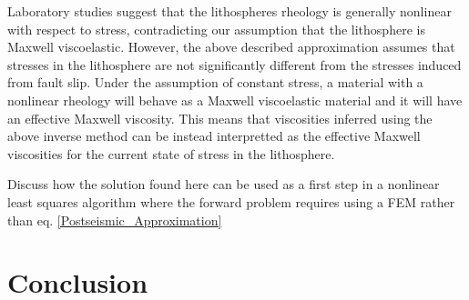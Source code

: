 \documentclass[12pt]{article}
\begin{document}
Laboratory studies suggest that the lithospheres rheology is generally
nonlinear with respect to stress, contradicting our assumption that
the lithosphere is Maxwell viscoelastic.  However, the above described
approximation assumes that stresses in the lithosphere are not
significantly different from the stresses induced from fault slip.
Under the assumption of constant stress, a material with a nonlinear
rheology will behave as a Maxwell viscoelastic material and it will
have an effective Maxwell viscosity.  This means that viscosities
inferred using the above inverse method can be instead interpretted as
the effective Maxwell viscosities for the current state of stress in
the lithosphere.

Discuss how the solution found here can be used as a first step in a
nonlinear least squares algorithm where the forward problem requires
using a FEM rather than eq. \ref{Postseismic_Approximation}
\section{Conclusion}
\end{document}
